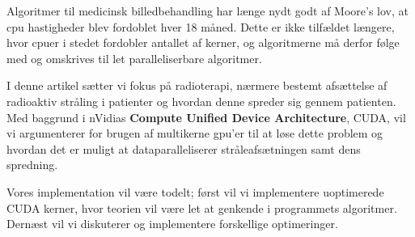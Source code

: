 


Algoritmer til medicinsk billedbehandling har længe nydt godt af
Moore's lov, at cpu hastigheder blev fordoblet hver 18 måned. Dette er
ikke tilfældet længere, hvor cpuer i stedet fordobler antallet af
kerner, og algoritmerne må derfor følge med og omskrives til let
paralleliserbare algoritmer.

I denne artikel sætter vi fokus på radioterapi, nærmere bestemt
afsættelse af radioaktiv stråling i patienter og hvordan denne spreder
sig gennem patienten. Med baggrund i nVidias \textbf{Compute Unified
  Device Architecture}, CUDA, vil vi argumenterer for brugen af
multikerne gpu'er til at løse dette problem og hvordan det er muligt
at dataparalleliserer stråleafsætningen samt dens spredning.

Vores implementation vil være todelt; først vil vi implementere
uoptimerede CUDA kerner, hvor teorien vil være let at genkende i
programmets algoritmer. Dernæst vil vi diskuterer og implementere
forskellige optimeringer.

